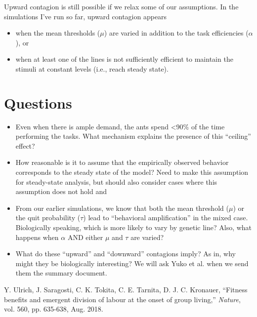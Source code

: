 \documentclass[10pt]{article}
\begin{document}
Upward contagion is still possible if we relax some of our assumptions. In the simulations I've run so far, upward contagion appears
\begin{itemize}
    \item when the mean thresholds ($\mu$) are varied in addition to the task efficiencies ($\alpha$), or
    \item when at least one of the lines is not sufficiently efficient to maintain the stimuli at constant levels (i.e., reach steady state).
\end{itemize}

\section{Questions}
\begin{itemize}
    \item {\color{orange}Even when there is ample demand, the ants spend <90\% of the time performing the tasks. What mechanism explains the presence of this ``ceiling'' effect?}
    
    \item How reasonable is it to assume that the empirically observed behavior corresponds to the steady state of the model? {\color{orange}Need to make this assumption for steady-state analysis, but should also consider cases where this assumption does not hold and }
    
    \item From our earlier simulations, we know that both the mean threshold ($\mu$) or the quit probability ($\tau$) lead to ``behavioral amplification'' in the mixed case.
    Biologically speaking, which is more likely to vary by genetic line? Also, what happens when $\alpha$ AND either $\mu$ and $\tau$ are varied?
    
    \item What do these ``upward'' and ``downward'' contagions imply? As in, why might they be biologically interesting? {\color{orange}We will ask Yuko et al. when we send them the summary document.}
\end{itemize}

\begin{thebibliography}{99}

 Y. Ulrich, J. Saragosti, C. K. Tokita, C. E. Tarnita, D. J. C. Kronauer, ``Fitness benefits and emergent division of labour at the onset of group living,'' \textit{Nature}, vol. 560, pp. 635-638, Aug. 2018.

\end{thebibliography}
\end{document}
